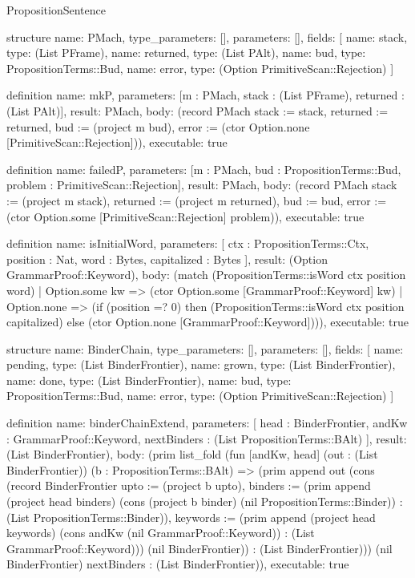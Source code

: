 \begin{lexlean}{PropositionSentence}
\begin{semanticmodule}
structure{
  name: PMach,
  type_parameters: [],
  parameters: [],
  fields: [
    {name: stack, type: (List PFrame)},
    {name: returned, type: (List PAlt)},
    {name: bud, type: PropositionTerms::Bud},
    {name: error, type: (Option PrimitiveScan::Rejection)}
  ]
}

definition{
  name: mkP,
  parameters: [m : PMach, stack : (List PFrame), returned : (List PAlt)],
  result: PMach,
  body: (record PMach {stack := stack, returned := returned, bud := (project m bud), error := (ctor Option.none [PrimitiveScan::Rejection])}),
  executable: true
}

definition{
  name: failedP,
  parameters: [m : PMach, bud : PropositionTerms::Bud, problem : PrimitiveScan::Rejection],
  result: PMach,
  body: (record PMach {stack := (project m stack), returned := (project m returned), bud := bud, error := (ctor Option.some [PrimitiveScan::Rejection] problem)}),
  executable: true
}

definition{
  name: isInitialWord,
  parameters: [
    ctx : PropositionTerms::Ctx,
    position : Nat,
    word : Bytes,
    capitalized : Bytes
  ],
  result: (Option GrammarProof::Keyword),
  body: (match (PropositionTerms::isWord ctx position word)
    | Option.some kw => (ctor Option.some [GrammarProof::Keyword] kw)
    | Option.none => (if (position =? 0) then (PropositionTerms::isWord ctx position capitalized) else (ctor Option.none [GrammarProof::Keyword]))),
  executable: true
}

structure{
  name: BinderChain,
  type_parameters: [],
  parameters: [],
  fields: [
    {name: pending, type: (List BinderFrontier)},
    {name: grown, type: (List BinderFrontier)},
    {name: done, type: (List BinderFrontier)},
    {name: bud, type: PropositionTerms::Bud},
    {name: error, type: (Option PrimitiveScan::Rejection)}
  ]
}

definition{
  name: binderChainExtend,
  parameters: [
    head : BinderFrontier,
    andKw : GrammarProof::Keyword,
    nextBinders : (List PropositionTerms::BAlt)
  ],
  result: (List BinderFrontier),
  body: (prim list_fold (fun [andKw, head] (out : (List BinderFrontier)) (b : PropositionTerms::BAlt) => (prim append out (cons (record BinderFrontier {upto := (project b upto), binders := (prim append (project head binders) (cons (project b binder) (nil PropositionTerms::Binder)) : (List PropositionTerms::Binder)), keywords := (prim append (project head keywords) (cons andKw (nil GrammarProof::Keyword)) : (List GrammarProof::Keyword))}) (nil BinderFrontier)) : (List BinderFrontier))) (nil BinderFrontier) nextBinders : (List BinderFrontier)),
  executable: true
}


\end{semanticmodule}
\end{lexlean}
